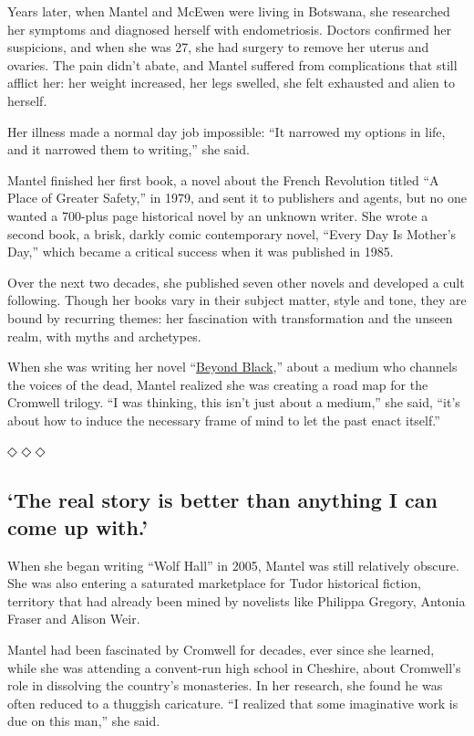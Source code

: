Years later, when Mantel and McEwen were living in Botswana, she
researched her symptoms and diagnosed herself with endometriosis.
Doctors confirmed her suspicions, and when she was 27, she had surgery
to remove her uterus and ovaries. The pain didn't abate, and Mantel
suffered from complications that still afflict her: her weight
increased, her legs swelled, she felt exhausted and alien to herself.

Her illness made a normal day job impossible: ``It narrowed my options
in life, and it narrowed them to writing,'' she said.

Mantel finished her first book, a novel about the French Revolution
titled ``A Place of Greater Safety,'' in 1979, and sent it to publishers
and agents, but no one wanted a 700-plus page historical novel by an
unknown writer. She wrote a second book, a brisk, darkly comic
contemporary novel, ``Every Day Is Mother's Day,'' which became a
critical success when it was published in 1985.

Over the next two decades, she published seven other novels and
developed a cult following. Though her books vary in their subject
matter, style and tone, they are bound by recurring themes: her
fascination with transformation and the unseen realm, with myths and
archetypes.

When she was writing her novel
``\href{https://www.nytimes3xbfgragh.onion/2005/05/15/books/review/beyond-black-demons-revealed.html}{Beyond
Black},'' about a medium who channels the voices of the dead, Mantel
realized she was creating a road map for the Cromwell trilogy. ``I was
thinking, this isn't just about a medium,'' she said, ``it's about how
to induce the necessary frame of mind to let the past enact itself.''

◇ ◇ ◇

\hypertarget{the-real-story-is-better-than-anything-i-can-come-up-with}{%
\subsection{`The real story is better than anything I can come up
with.'}\label{the-real-story-is-better-than-anything-i-can-come-up-with}}

When she began writing ``Wolf Hall'' in 2005, Mantel was still
relatively obscure. She was also entering a saturated marketplace for
Tudor historical fiction, territory that had already been mined by
novelists like Philippa Gregory, Antonia Fraser and Alison Weir.

Mantel had been fascinated by Cromwell for decades, ever since she
learned, while she was attending a convent-run high school in Cheshire,
about Cromwell's role in dissolving the country's monasteries. In her
research, she found he was often reduced to a thuggish caricature. ``I
realized that some imaginative work is due on this man,'' she said.

